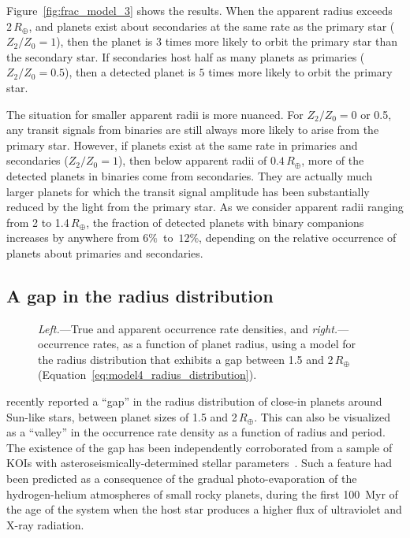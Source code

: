 \documentclass[12pt,modern,trackchanges]{aastex61}
\begin{document}
Figure~\ref{fig:frac_model_3} shows the results.  When the apparent
radius exceeds $2\,R_\oplus$, and planets exist about secondaries at
the same rate as the primary star ($Z_2/Z_0=1$), then the planet is
$3$ times more likely to orbit the primary star than the secondary
star.  If secondaries host half as many planets as primaries
($Z_2/Z_0=0.5$), then a detected planet is $5$ times more likely to
orbit the primary star.

The situation for smaller apparent radii is more nuanced.  For
$Z_2/Z_0=0$ or 0.5, any transit signals from binaries are still always
more likely to arise from the primary star.  However, if planets exist
at the same rate in primaries and secondaries ($Z_2/Z_0=1$), then
below apparent radii of $0.4\,R_\oplus$, more of the detected planets
in binaries come from secondaries.  They are actually much larger
planets for which the transit signal amplitude has been substantially
reduced by the light from the primary star.  As we consider apparent
radii ranging from 2 to 1.4\,$R_\oplus$, the fraction of detected
planets with binary companions increases by anywhere from
$6\%$~to~$12\%$, depending on the relative occurrence of planets about
primaries and secondaries.


\subsection{A gap in the radius distribution}
\label{sec:further_models}

\begin{figure}[!t]
    \centering
    \caption{ {\it Left.}---True and apparent occurrence rate densities,
      and {\it right.}---occurrence rates, as a function of planet
      radius, using a model for the radius distribution that exhibits
      a gap between 1.5 and 2\,$R_\oplus$
      (Equation~\ref{eq:model4_radius_distribution}). 
    }
    \label{fig:model_4}
\end{figure}

\citet{fulton_california-_2017} recently reported a ``gap'' in the
radius distribution of close-in planets around Sun-like stars, between
planet sizes of 1.5 and 2\,$R_\oplus$.  This can also be visualized as
a ``valley'' in the occurrence rate density as a function of radius
and period.  The existence of the gap has been independently
corroborated from a sample of KOIs with asteroseismically-determined
stellar parameters~\citep{van_eylen_asteroseismic_2017}.  Such a
feature had been predicted as a consequence of the gradual
photo-evaporation of the hydrogen-helium atmospheres of small rocky
planets, during the first 100~Myr of the age of the system when the
host star produces a higher flux of ultraviolet and X-ray
radiation.
\end{document}
